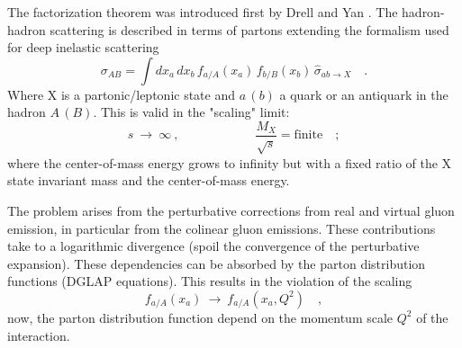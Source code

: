 The factorization theorem was introduced first by Drell and Yan \cite{DRELL1971578}. 
The hadron-hadron scattering is described in terms of partons extending the formalism used for deep inelastic scattering 
\begin{equation}
\sigma_{AB}=\displaystyle\int dx_a\,dx_b\,f_{a/A}(x_a)\,f_{b/B}(x_b)\,\hat{\sigma}_{ab \rightarrow X}\quad .
\label{eq:factorization1}
\end{equation}
Where X is a partonic/leptonic state and $a\,(b)$ a quark or an antiquark in the hadron $A\,(B)$. This is valid in the "scaling" limit:
\begin{equation}
	s\ \longrightarrow\ \infty\ , \qquad\qquad\qquad \frac{M_X}{\sqrt{s}}=\text{finite}\quad ;
\end{equation}
where the center-of-mass energy grows to infinity but with a fixed ratio of the X state invariant mass and the center-of-mass energy.

The problem arises from the perturbative corrections from real and virtual gluon emission, in particular from the colinear gluon emissions. These contributions take to a logarithmic divergence (spoil the convergence of the perturbative expansion). These dependencies can be absorbed by the parton distribution functions (DGLAP equations). This results in the violation of the scaling 
\begin{equation}
	f_{a/A}(x_a)\ \longrightarrow\ f_{a/A}(x_a, Q^2)\quad , 
\end{equation}  
now, the parton distribution function depend on the momentum scale $Q^2$ of the interaction. 

